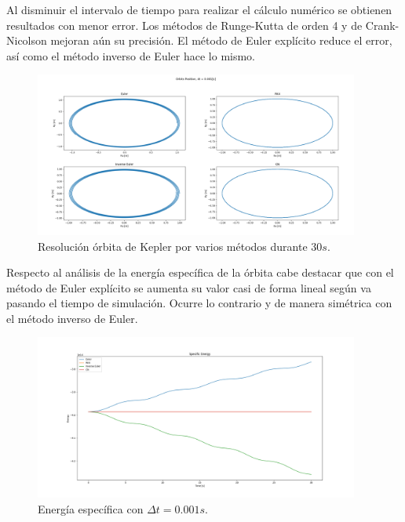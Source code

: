 \documentclass[12pt,a4paper]{article}
\begin{document}
Al disminuir el intervalo de tiempo para realizar el cálculo numérico se obtienen resultados con menor error. Los métodos de Runge-Kutta de orden 4 y de Crank-Nicolson mejoran aún su precisión. El método de Euler explícito reduce el error, así como el método inverso de Euler hace lo mismo. 
\begin{figure}[H] 
	\centering
	\includegraphics[width=0.95\textwidth]{FIGURES/dt0.001_newton_pos.png}
	\caption{Resolución órbita de Kepler por varios métodos durante 30$s$.}
\end{figure}
Respecto al análisis de la energía específica de la órbita cabe destacar que con el método de Euler explícito se aumenta su valor casi de forma lineal según va pasando el tiempo de simulación. Ocurre lo contrario y de manera simétrica con el método inverso de Euler. 
\begin{figure}[H] 
	\centering
	\includegraphics[width=0.95\textwidth]{FIGURES/dt0.001_fsolve_energy.png}
	\caption{Energía específica con $\Delta t = 0.001 s$.}
\end{figure}
\end{document}
